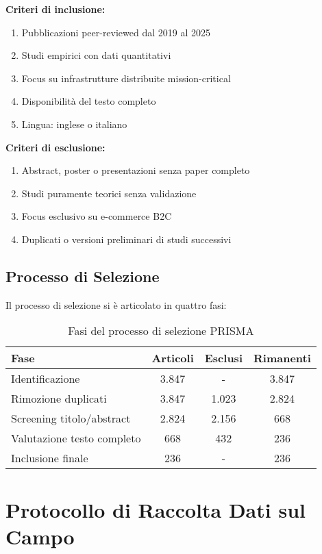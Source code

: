 \textbf{Criteri di inclusione:}
\begin{enumerate}
    \item Pubblicazioni peer-reviewed dal 2019 al 2025
    \item Studi empirici con dati quantitativi
    \item Focus su infrastrutture distribuite mission-critical
    \item Disponibilità del testo completo
    \item Lingua: inglese o italiano
\end{enumerate}

\textbf{Criteri di esclusione:}
\begin{enumerate}
    \item Abstract, poster o presentazioni senza paper completo
    \item Studi puramente teorici senza validazione
    \item Focus esclusivo su e-commerce B2C
    \item Duplicati o versioni preliminari di studi successivi
\end{enumerate}

\subsection{\texorpdfstring{Processo di Selezione}{A.1.3 - Processo di Selezione}}

Il processo di selezione si è articolato in quattro fasi:

\begin{table}[htbp]
\centering
\caption{Fasi del processo di selezione PRISMA}
\begin{tabular}{|l|c|c|c|}
\hline
\textbf{Fase} & \textbf{Articoli} & \textbf{Esclusi} & \textbf{Rimanenti} \\
\hline
Identificazione & 3.847 & - & 3.847 \\
Rimozione duplicati & 3.847 & 1.023 & 2.824 \\
Screening titolo/abstract & 2.824 & 2.156 & 668 \\
Valutazione testo completo & 668 & 432 & 236 \\
Inclusione finale & 236 & - & 236 \\
\hline
\end{tabular}
\end{table}

\section{\texorpdfstring{Protocollo di Raccolta Dati sul Campo}{A.2 - Protocollo di Raccolta Dati sul Campo}}

